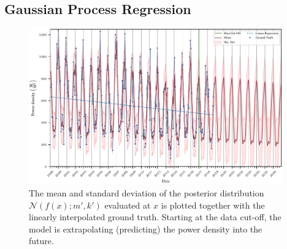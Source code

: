\documentclass{article}
\theoremstyle{plain}
\theoremstyle{definition}
\theoremstyle{remark}
\begin{document}
\subsection{Gaussian Process Regression}
\begin{figure}[htb!]
    \centering
    \includegraphics[width=0.975\textwidth]{fig/gp_pred.pdf}
    \caption{The \textcolor{TUred}{mean} and \textcolor{TUred}{standard deviation} of the posterior distribution $\mathcal{N}(f(x); m', k')$ evaluated at $x$ is plotted together with the linearly interpolated \textcolor{TUdarkblue}{ground truth}. Starting at the \textcolor{TUdarkgreen}{data cut-off}, the model is extrapolating (predicting) the power density into the future.}
    \label{fig:gp-pred}
\end{figure}
\end{document}
